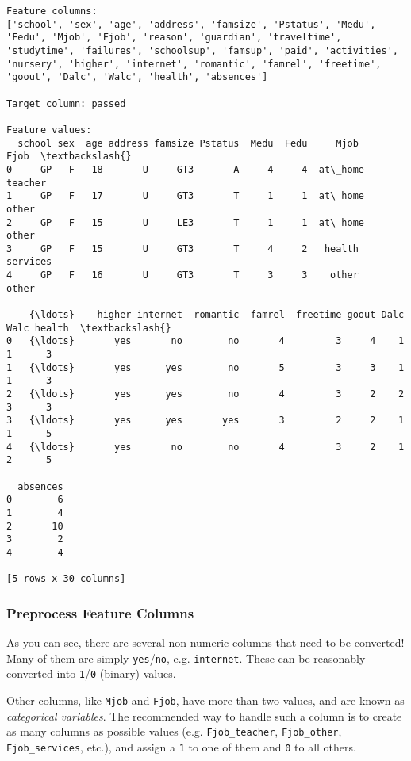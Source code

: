 \documentclass{ctexart}
\begin{document}
    \begin{Verbatim}[commandchars=\\\{\}]
Feature columns:
['school', 'sex', 'age', 'address', 'famsize', 'Pstatus', 'Medu', 'Fedu', 'Mjob', 'Fjob', 'reason', 'guardian', 'traveltime', 'studytime', 'failures', 'schoolsup', 'famsup', 'paid', 'activities', 'nursery', 'higher', 'internet', 'romantic', 'famrel', 'freetime', 'goout', 'Dalc', 'Walc', 'health', 'absences']

Target column: passed

Feature values:
  school sex  age address famsize Pstatus  Medu  Fedu     Mjob      Fjob  \textbackslash{}
0     GP   F   18       U     GT3       A     4     4  at\_home   teacher   
1     GP   F   17       U     GT3       T     1     1  at\_home     other   
2     GP   F   15       U     LE3       T     1     1  at\_home     other   
3     GP   F   15       U     GT3       T     4     2   health  services   
4     GP   F   16       U     GT3       T     3     3    other     other   

    {\ldots}    higher internet  romantic  famrel  freetime goout Dalc Walc health  \textbackslash{}
0   {\ldots}       yes       no        no       4         3     4    1    1      3   
1   {\ldots}       yes      yes        no       5         3     3    1    1      3   
2   {\ldots}       yes      yes        no       4         3     2    2    3      3   
3   {\ldots}       yes      yes       yes       3         2     2    1    1      5   
4   {\ldots}       yes       no        no       4         3     2    1    2      5   

  absences  
0        6  
1        4  
2       10  
3        2  
4        4  

[5 rows x 30 columns]
    \end{Verbatim}

    \subsubsection{Preprocess Feature
Columns}\label{preprocess-feature-columns}

As you can see, there are several non-numeric columns that need to be
converted! Many of them are simply \texttt{yes}/\texttt{no}, e.g.
\texttt{internet}. These can be reasonably converted into
\texttt{1}/\texttt{0} (binary) values.

Other columns, like \texttt{Mjob} and \texttt{Fjob}, have more than two
values, and are known as \emph{categorical variables}. The recommended
way to handle such a column is to create as many columns as possible
values (e.g. \texttt{Fjob\_teacher}, \texttt{Fjob\_other},
\texttt{Fjob\_services}, etc.), and assign a \texttt{1} to one of them
and \texttt{0} to all others.
\end{document}
